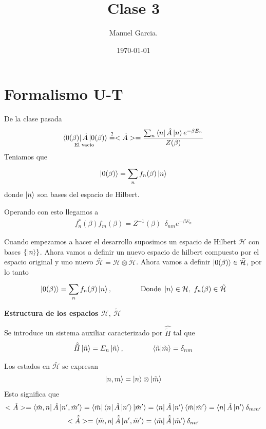 \documentclass{article}
\title{Clase 3}
\author{Manuel Garcia.}
\date{\today}
\begin{document}
\maketitle

\section{Formalismo U-T }
De la clase pasada
\begin{gather*}
  \underset{\text{El vacio }}{\bra{0(\beta)}\hat A \ket{0(\beta)} } \overset{?}{=}<\hat A > = \frac{\sum_{n }^{} \bra{n }\hat A \ket{n } e ^ {-\beta E_n }   }{Z (\beta )} 
\end{gather*}
Teniamos que
\begin{gather*}
  \ket{0(\beta)} = \displaystyle\sum_{n }^{} f_n(\beta) \ket{n } 
\end{gather*}
donde $ \ket{n } $ son bases del espacio de Hilbert.

\hfill 

Operando con esto llegamos a 
\begin{gather*}
  f_n^*(\beta) f_m(\beta)= Z ^ {-1 }(\beta)\ \ \delta _{nm} e ^ {-\beta E_n } 
\end{gather*}

Cuando empezamos a hacer el desarrollo suposimos un espacio de Hilbert $ \mathcal H  $ con bases $ \{\ket{n }\} $. Ahora vamos a definir un nuevo espacio de hilbert compuesto por el espacio original y uno nuevo $ \bar{\mathcal H } = \mathcal H \otimes \tilde{\mathcal H}$. Ahora vamos a definir $ \ket{0(\beta)} \in \bar{\mathcal H } $, por lo tanto 
\begin{gather*}
  \ket{0(\beta)} = \displaystyle\sum_{n }^{} f_n(\beta) \ket{n }, \qquad \qquad \text{Donde }\ket{n }\in \mathcal H, \ f_n(\beta) \in \tilde{\mathcal H }  
\end{gather*}

\hfill 

\hfill 

\textbf{Estructura de los espacios $ \mathcal H, \ \tilde{\mathcal H } $}

Se introduce un sistema auxiliar caracterizado por $ \hat{\tilde{H }} $ tal que 
\begin{gather*}
   \hat{\tilde{H }} \ket{\tilde n } = E_n \ket{\tilde n }, \qquad \qquad \bra{\tilde n }\ket{\tilde m } = \delta _{nm }  
\end{gather*}

Los estados en $ \bar{\mathcal H } $ se expresan 
\begin{gather*}
  \ket{n,m } = \ket{n }\otimes \ket{\tilde m } 
\end{gather*}
Esto significa que 
\begin{gather*}
  <\hat A> = \bra{\tilde m, n }\hat A \ket{n', \tilde m'} = \bra{\tilde m } \bra{n } \hat A \ket{n' } \ket{\tilde m' } = \bra{n }\hat A \ket{n' }\bra{\tilde m }\ket{\tilde m' } = \bra{n }\hat A \ket{n' } \delta _{mm'}       \\
  <\hat{\tilde A }> = \bra{\tilde m, n }\hat{\tilde A }\ket{n',\tilde m' } = \bra{\tilde m }\hat{\tilde A }\ket{\tilde m' }\delta _{nn'}   
\end{gather*}
\end{document}
